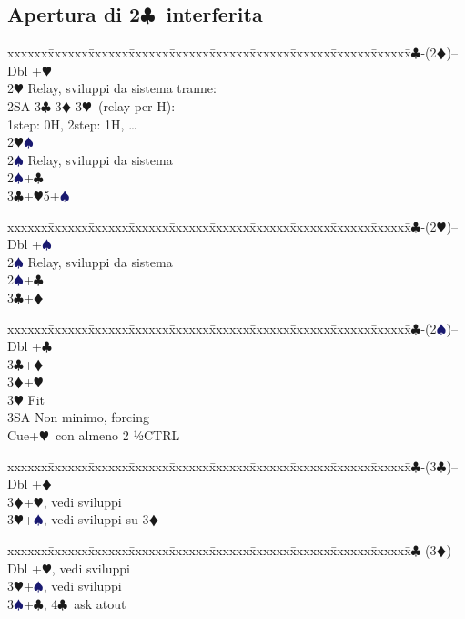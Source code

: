 \documentclass[a4paper,italian]{article}
\newcommand{\BC}{\textcolor{OliveGreen}{$\clubsuit$}}
\newcommand{\BD}{\textcolor{RedOrange}{$\vardiamondsuit$}}
\newcommand{\BH}{\textcolor{Red2}{$\varheartsuit${}}}
\newcommand{\BS}{\textcolor{MidnightBlue}{$\spadesuit${}}}
\newcommand{\pdfc}{\texorpdfstring{\BC{}}{C}}
\newenvironment{bidtable}
{\begin{tabbing}

    xxxxxx\=xxxxxx\=xxxxxx\=xxxxxx\=xxxxxx\=xxxxxx\=xxxxxx\=xxxxxx\=xxxxxx\=xxxxxx\=\kill}
{\end{tabbing} }%
\begin{document}
\begin{multicols}{2}

    \subsection{Apertura di 2\pdfc\ interferita}

    \begin{bidtable}
        2\BC-(2\BD)--\+\\
        Dbl +\BH\+\\
        2\BH\> Relay, sviluppi da sistema tranne:
        \+\\
        2SA-3\BC-3\BD-3\BH\ (relay per H):\\
        1step: 0H, 2step: 1H, \dots\-\-\\
        2\BH{}\BS\+\\
        2\BS\> Relay, sviluppi da sistema\-\\
        2\BS{}+\BC\\
        3\BC{}+\BH5+\BS\\
    \end{bidtable}
    \begin{bidtable}
        2\BC-(2\BH)--\+\\
        Dbl +\BS\+\\
        2\BS\> Relay, sviluppi da sistema\-\\
        2\BS{}+\BC\\
        3\BC{}+\BD\\
    \end{bidtable}
    \begin{bidtable}
        2\BC-(2\BS)--\+\\
        Dbl +\BC\\
        3\BC{}+\BD\\
        3\BD {}+\BH\+\\
        3\BH\> Fit\+\\
        3SA\> Non minimo, forcing\\
        Cue+\BH\ con almeno 2 ½CTRL\-\-\\
    \end{bidtable}
    \begin{bidtable}
        2\BC-(3\BC)--\+\\
        Dbl +\BD\\
        3\BD {}+\BH, vedi sviluppi\\
        3\BH {}+\BS, vedi sviluppi su 3\BD\\
    \end{bidtable}
    \begin{bidtable}
        2\BC-(3\BD)--\+\\
        Dbl +\BH, vedi sviluppi\\
        3\BH {}+\BS, vedi sviluppi\\
        3\BS {}+\BC, 4\BC\ ask atout
    \end{bidtable}
\end{multicols}
\end{document}
